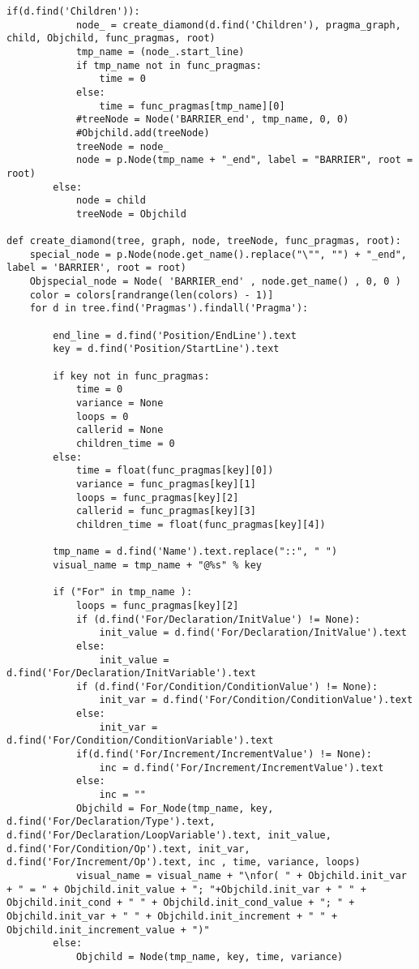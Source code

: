 \documentclass[a4paper,10pt,twoside]{book}
\begin{document}
\begin{lstlisting}[language=CCC, caption=pargraph.py]
		if(d.find('Children')):
			node_ = create_diamond(d.find('Children'), pragma_graph, child, Objchild, func_pragmas, root)
			tmp_name = (node_.start_line)
			if tmp_name not in func_pragmas:
				time = 0
			else:
				time = func_pragmas[tmp_name][0]
			#treeNode = Node('BARRIER_end', tmp_name, 0, 0)
			#Objchild.add(treeNode)
			treeNode = node_
			node = p.Node(tmp_name + "_end", label = "BARRIER", root = root)
		else:
			node = child
			treeNode = Objchild

def create_diamond(tree, graph, node, treeNode, func_pragmas, root):
	special_node = p.Node(node.get_name().replace("\"", "") + "_end", label = 'BARRIER', root = root)
	Objspecial_node = Node( 'BARRIER_end' , node.get_name() , 0, 0 )
	color = colors[randrange(len(colors) - 1)]
	for d in tree.find('Pragmas').findall('Pragma'):

		end_line = d.find('Position/EndLine').text
		key = d.find('Position/StartLine').text

		if key not in func_pragmas:
			time = 0
			variance = None
			loops = 0
			callerid = None
			children_time = 0
		else:
			time = float(func_pragmas[key][0])
			variance = func_pragmas[key][1]
			loops = func_pragmas[key][2]
			callerid = func_pragmas[key][3]
			children_time = float(func_pragmas[key][4])

		tmp_name = d.find('Name').text.replace("::", " ")
		visual_name = tmp_name + "@%s" % key

		if ("For" in tmp_name ):
			loops = func_pragmas[key][2]
			if (d.find('For/Declaration/InitValue') != None):
				init_value = d.find('For/Declaration/InitValue').text
			else:
				init_value = d.find('For/Declaration/InitVariable').text
			if (d.find('For/Condition/ConditionValue') != None):
				init_var = d.find('For/Condition/ConditionValue').text
			else:
				init_var = d.find('For/Condition/ConditionVariable').text
			if(d.find('For/Increment/IncrementValue') != None):
				inc = d.find('For/Increment/IncrementValue').text
			else:
				inc = ""
			Objchild = For_Node(tmp_name, key, d.find('For/Declaration/Type').text, d.find('For/Declaration/LoopVariable').text, init_value, d.find('For/Condition/Op').text, init_var, d.find('For/Increment/Op').text, inc , time, variance, loops)
			visual_name = visual_name + "\nfor( " + Objchild.init_var + " = " + Objchild.init_value + "; "+Objchild.init_var + " " + Objchild.init_cond + " " + Objchild.init_cond_value + "; " + Objchild.init_var + " " + Objchild.init_increment + " " + Objchild.init_increment_value + ")"
		else:
			Objchild = Node(tmp_name, key, time, variance)


\end{lstlisting}
\end{document}
